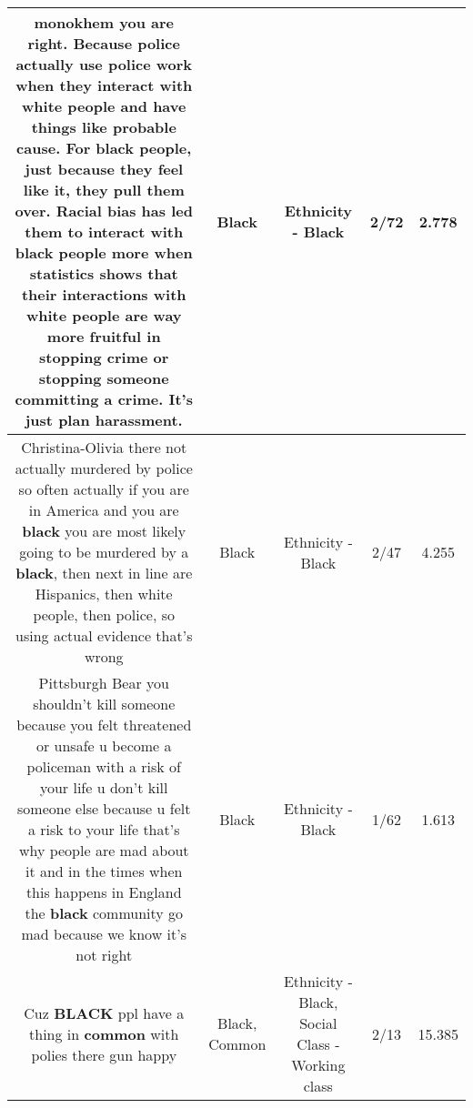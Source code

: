\documentclass[11pt]{article}
\newlength\mylength
\begin{document}
\begin{center}
\begin{longtable}{|C{.65\mylength}|C{.30\mylength}|C{.12\mylength}|C{.12\mylength}|C{.12\mylength}|}
  \small monokhem you are right. Because police actually use police work when they interact with white people and have things like probable cause. For \textbf{black} people, just because they feel like it, they pull them over. Racial bias has led them to interact with \textbf{black} people more when statistics shows that their interactions with white people are way more fruitful in stopping crime or stopping someone committing a crime. It's just plan harassment.\normalsize   & Black & Ethnicity - Black & 2/72 & 2.778 \\  \hline
  \small Christina-Olivia there not actually murdered by police so often actually if you are in America and you are \textbf{black} you are most likely going to be murdered by a \textbf{black}, then next in line are Hispanics, then white people, then police, so using actual evidence that's wrong\normalsize   & Black & Ethnicity - Black & 2/47 & 4.255 \\  \hline
  \small Pittsburgh Bear you shouldn't kill someone because you felt threatened or unsafe u become a policeman with a risk of your life u don't kill someone else because u felt a risk to your life that's why people are mad about it and in the times when this happens in England the \textbf{black} community  go mad because we know it's not right\normalsize   & Black & Ethnicity - Black & 1/62 & 1.613 \\  \hline
  \small Cuz \textbf{BLACK} ppl have a thing in \textbf{common} with polies there gun happy\normalsize   & Black, Common & Ethnicity - Black, Social Class - Working class & 2/13 & 15.385 \\  \hline

\end{longtable}
\end{center}
\end{document}

